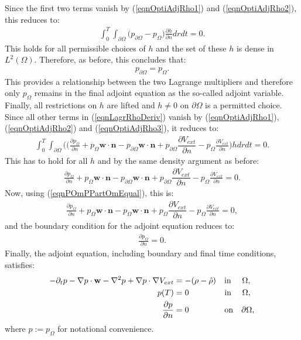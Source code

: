 Since the first two terms vanish by (\ref{eqnOptiAdjRho1}) and (\ref{eqnOptiAdjRho2}), this reduces to:
\begin{align}\label{eqnOptiAdjRho3}
\int_0^T \int_{\partial \Omega}   \bigg( p_{\partial \Omega}- p_\Omega \bigg) \frac{\partial h}{\partial n} dr  dt  =0.
\end{align}
This holds for all permissible choices of $h$ and the set of these $h$ is dense in $L^2(\Omega)$. Therefore, as before, this concludes that:
\begin{align}\label{eqnPOmPPartOmEqual}
p_{\partial \Omega}= p_\Omega.
\end{align} 
This provides a relationship between the two Lagrange multipliers and therefore only $p_\Omega$ remains in the final adjoint equation as the so-called adjoint variable.
Finally, all restrictions on $h$ are lifted and $h \neq 0 $ on $ \partial \Omega$ is a permitted choice. Since all other terms in (\ref{eqnLagrRhoDeriv}) vanish by  (\ref{eqnOptiAdjRho1}), (\ref{eqnOptiAdjRho2}) and (\ref{eqnOptiAdjRho3}), it reduces to:
\begin{align*}
\int_0^T  \int_{\partial \Omega}  \bigg(
\bigg(\frac{\partial p_\Omega }{\partial n} + p_\Omega \mathbf{w} \cdot \mathbf{n} - p_{\partial \Omega} \mathbf{w} \cdot \mathbf{n} +  p_{\partial \Omega} \dfrac{\partial V_{ext}}{\partial n} - p_\Omega \frac{\partial V_{ext}}{\partial n} \bigg)h dr dt =0.
\end{align*}
This has to hold for all $h$ and by the same density argument as before:
\begin{align*}
\frac{\partial p_\Omega }{\partial n} + p_\Omega  \mathbf{w} \cdot \mathbf{n} - p_{\partial \Omega} \mathbf{w} \cdot \mathbf{n} +  p_{\partial \Omega} \dfrac{\partial V_{ext}}{\partial n} - p_\Omega \frac{\partial V_{ext}}{\partial n} =0.
\end{align*}
Now, using (\ref{eqnPOmPPartOmEqual}), this is:
\begin{align*}
\frac{\partial p_\Omega }{\partial n} + p_\Omega  \textbf{w}\cdot \mathbf{n} - p_{ \Omega} \mathbf{w} \cdot \mathbf{n} +  p_{ \Omega} \dfrac{\partial V_{ext}}{\partial n} - p_\Omega \frac{\partial V_{ext}}{\partial n} =0,
\end{align*}
and the boundary condition for the adjoint equation reduces to:
\begin{align}\label{eqnOptiAdjRhoBC1}
\frac{\partial p_\Omega }{\partial n} =0.
\end{align}
Finally, the adjoint equation, including boundary and final time conditions, satisfies:
\begin{align} \label{sysAdjointEquation}
 - \partial_t  p  - \nabla p \cdot \mathbf{w}  - \nabla^2 p 
+  \nabla p \cdot \nabla V_{ext} &=-(\rho- \hat{\rho})  \quad \text{in} \quad \ \Omega,\\
p(T) &= 0 \quad \quad\quad \quad \ \text{in} \quad \ \Omega, \notag\\
\frac{\partial p }{\partial n} &=0 \quad  \ \quad\quad\quad \text{on} \quad \partial\Omega, \notag
\end{align}
where $p :=p_\Omega$ for notational convenience.

